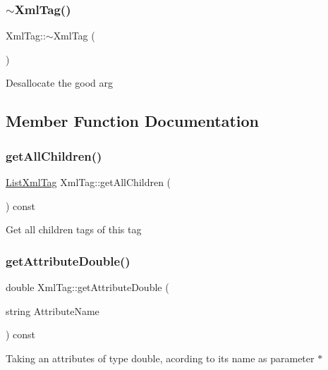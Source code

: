 \subsubsection{\texorpdfstring{$\sim$\+Xml\+Tag()}{~XmlTag()}}
{\footnotesize\ttfamily Xml\+Tag\+::$\sim$\+Xml\+Tag (\begin{DoxyParamCaption}{ }\end{DoxyParamCaption})}

Desallocate the good arg 

\subsection{Member Function Documentation}
\mbox{\label{classXmlTag_a7ef12656343543108cae06ceb94fc0ab}} 
\subsubsection{\texorpdfstring{get\+All\+Children()}{getAllChildren()}}
{\footnotesize\ttfamily \hyperlink{XmlExtra_8h_ade6a1aa0dc76b2c26a120f5c2f10ff7d}{List\+Xml\+Tag} Xml\+Tag\+::get\+All\+Children (\begin{DoxyParamCaption}{ }\end{DoxyParamCaption}) const}

Get all children tags of this tag \mbox{\label{classXmlTag_a24fd3594f3ec5f2391f1f3c75a0ddbfd}} 
\subsubsection{\texorpdfstring{get\+Attribute\+Double()}{getAttributeDouble()}}
{\footnotesize\ttfamily double Xml\+Tag\+::get\+Attribute\+Double (\begin{DoxyParamCaption}\item[{string}]{Attribute\+Name }\end{DoxyParamCaption}) const}

Taking an attribute\textquotesingle{}s of type double, acording to its name as parameter $\ast$ \mbox{\label{classXmlTag_a311499d078b772530223c6f2ebbf6857}} 
